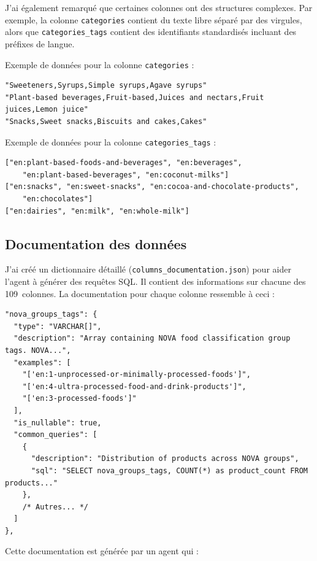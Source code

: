 \documentclass[a4paper,11pt]{article}
\begin{document}
J'ai également remarqué que certaines colonnes ont des structures complexes. 
Par exemple, la colonne \texttt{categories} contient du texte libre séparé par des virgules, alors que \texttt{categories\_tags} contient des identifiants standardisés incluant des préfixes de langue.

Exemple de données pour la colonne \texttt{categories} :

\begin{lstlisting}
"Sweeteners,Syrups,Simple syrups,Agave syrups"
"Plant-based beverages,Fruit-based,Juices and nectars,Fruit juices,Lemon juice"
"Snacks,Sweet snacks,Biscuits and cakes,Cakes"
\end{lstlisting}

Exemple de données pour la colonne \texttt{categories\_tags} :

\begin{lstlisting}
["en:plant-based-foods-and-beverages", "en:beverages", 
    "en:plant-based-beverages", "en:coconut-milks"]
["en:snacks", "en:sweet-snacks", "en:cocoa-and-chocolate-products", 
    "en:chocolates"]
["en:dairies", "en:milk", "en:whole-milk"]
\end{lstlisting}



\subsection{Documentation des données}

J'ai créé un dictionnaire détaillé
(\texttt{columns\_documentation.json}) pour aider l'agent à générer des requêtes SQL. Il contient des informations sur chacune des 109~colonnes.
La documentation pour chaque colonne ressemble à ceci :


\begin{lstlisting}
"nova_groups_tags": {
  "type": "VARCHAR[]",
  "description": "Array containing NOVA food classification group tags. NOVA...",
  "examples": [
    "['en:1-unprocessed-or-minimally-processed-foods']",
    "['en:4-ultra-processed-food-and-drink-products']",
    "['en:3-processed-foods']"
  ],
  "is_nullable": true,
  "common_queries": [
    {
      "description": "Distribution of products across NOVA groups",
      "sql": "SELECT nova_groups_tags, COUNT(*) as product_count FROM products..."
    },
    /* Autres... */
  ]
},
\end{lstlisting}

Cette documentation est générée par un agent qui :
\end{document}
